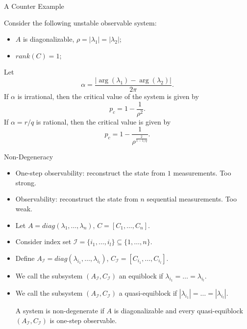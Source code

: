 \documentclass[10pt]{beamer}
\DeclareMathOperator{\1}{\textbf{1}}
\begin{document}
  \begin{frame}{A Counter Example}
    \begin{theorem}
      Consider the following unstable observable system:
      \begin{itemize}
	\item  $A$ is diagonalizable, $\rho = |\lambda_1| = |\lambda_2| $;
	\item  $rank(C) = 1$;
      \end{itemize}
      Let
      \begin{displaymath}
	\alpha = \frac{|\arg(\lambda_1)-\arg(\lambda_2)|}{2\pi}.	
      \end{displaymath}
      If $\alpha$ is irrational, then the critical value of the system is given by
      \begin{displaymath}
	p_c = 1-\frac{1}{\rho^2}.
      \end{displaymath}
      If $\alpha = r/q$ is rational, then the critical value is given by
      \begin{displaymath}
	p_c = 1-\frac{1}{\rho^{\frac{2}{1-1/q}}}.
      \end{displaymath}
    \end{theorem}
  \end{frame}

  \begin{frame}{Non-Degeneracy}
    \begin{itemize}
      \item One-step observability: reconstruct the state from $1$ measurements. Too strong. 
      \item Observability: reconstruct the state from $n$ sequential measurements. Too weak.
      \item Let $A = diag(\lambda_1,\ldots,\lambda_n)$, $C = [C_1,\ldots, C_n]$.
      \item Consider index set $\mathcal I = \{i_1,\ldots,i_l\}\subseteq \{1,\ldots,n\}$.
      \item Define $A_{\mathcal I} = diag(\lambda_{i_1},\ldots,\lambda_{i_l})$, $C_{\mathcal I} = [C_{i_1},\ldots,C_{i_l}]$.
      \item We call the subsystem $(A_{\mathcal I}, C_{\mathcal I})$ an equiblock if $\lambda_{i_1}=\ldots=\lambda_{i_l}$. 
      \item We call the subsystem $(A_{\mathcal I}, C_{\mathcal I})$ a quasi-equiblock if $|\lambda_{i_1}|=\ldots=|\lambda_{i_l}|$. 
	\begin{definition}
	  A system is non-degenerate if $A$ is diagonalizable and every quasi-equiblock $(A_{\mathcal I},C_{\mathcal I})$ is one-step observable.
	\end{definition}
    \end{itemize}
  \end{frame}
\end{document}
